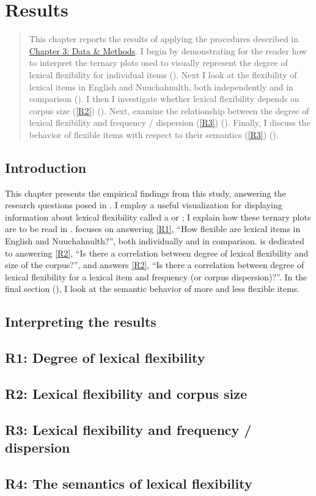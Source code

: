 \chapter{Results}
\label{ch:results}

\blockquote{This chapter reports the results of applying the procedures described in \hyperref[ch:methods]{Chapter 3: Data \& Methods}. I begin by demonstrating for the reader how to interpret the ternary plots used to visually represent the degree of lexical flexibility for individual items (). Next I look at the flexibility of lexical items in English and Nuuchahnulth, both independently and in comparison (). I then I investigate whether lexical flexibility depends on corpus size (\ref{R2}) (). Next, examine the relationship between the degree of lexical flexibility and frequency / dispersion (\ref{R3}) (). Finally, I discuss the behavior of flexible items with respect to their semantics (\ref{R3}) ().}

\section{Introduction}
\label{sec:4.1}

This chapter presents the empirical findings from this study, answering the research questions posed in . I employ a useful visualization for displaying information about lexical flexibility called a  or ; I explain how these ternary plots are to be read in .  focuses on answering \ref{R1}, \enquote{How flexible are lexical items in English and Nuuchahnulth?}, both individually and in comparison.  is dedicated to answering \ref{R2}, \enquote{Is there a correlation between degree of lexical flexibility and size of the corpus?}, and  answers \ref{R2}, \enquote{Is there a correlation between degree of lexical flexibility for a lexical item and frequency (or corpus dispersion)?}. In the final section (), I look at the semantic behavior of more and less flexible items.

\section{Interpreting the results}
\label{sec:4.2}

\section{R1: Degree of lexical flexibility}
\label{sec:4.3}

\section{R2: Lexical flexibility and corpus size}
\label{sec:4.4}

\section{R3: Lexical flexibility and frequency / dispersion}
\label{sec:4.5}

\section{R4: The semantics of lexical flexibility}
\label{sec:4.6}
